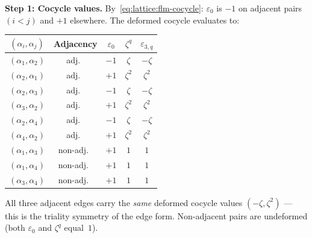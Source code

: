\begin{computation}[\texorpdfstring{$D_4$}{D_4} at the Coxeter root: \texorpdfstring{$N = 3$}{N = 3}, triality]
\noindent\textbf{Step 1: Cocycle values.}
By~\eqref{eq:lattice:flm-cocycle}: $\varepsilon_0$ is $-1$ on adjacent
pairs $(i < j)$ and $+1$ elsewhere.
The deformed cocycle evaluates to:
\begin{center}
\renewcommand{\arraystretch}{1.3}
{\small
\begin{tabular}{c c c c c}
$(\alpha_i,\alpha_j)$ & Adjacency
  & $\varepsilon_0$ & $\zeta^{q}$ & $\varepsilon_{3,q}$ \\
\hline
$(\alpha_1,\alpha_2)$ & adj.\ & $-1$ & $\zeta$ & $-\zeta$ \\
$(\alpha_2,\alpha_1)$ & adj.\ & $+1$ & $\zeta^2$ & $\zeta^2$ \\
$(\alpha_2,\alpha_3)$ & adj.\ & $-1$ & $\zeta$ & $-\zeta$ \\
$(\alpha_3,\alpha_2)$ & adj.\ & $+1$ & $\zeta^2$ & $\zeta^2$ \\
$(\alpha_2,\alpha_4)$ & adj.\ & $-1$ & $\zeta$ & $-\zeta$ \\
$(\alpha_4,\alpha_2)$ & adj.\ & $+1$ & $\zeta^2$ & $\zeta^2$ \\
\hline
$(\alpha_1,\alpha_3)$ & non-adj.\ & $+1$ & $1$ & $1$ \\
$(\alpha_1,\alpha_4)$ & non-adj.\ & $+1$ & $1$ & $1$ \\
$(\alpha_3,\alpha_4)$ & non-adj.\ & $+1$ & $1$ & $1$
\end{tabular}
}
\end{center}
All three adjacent edges carry the \emph{same} deformed cocycle values
$(-\zeta, \zeta^2)$ --- this is the triality symmetry of the edge form.
Non-adjacent pairs are undeformed (both $\varepsilon_0$ and $\zeta^q$
equal~$1$).
\smallskip


\end{computation}
